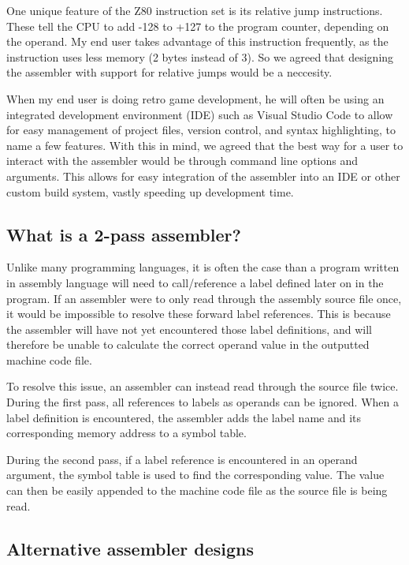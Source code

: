 \documentclass[a4paper]{report}
\begin{document}
One unique feature of the Z80 instruction set is its relative jump instructions.
These tell the CPU to add -128 to +127 to the program counter, depending on the
operand. My end user takes advantage of this instruction frequently, as the
instruction uses less memory (2 bytes instead of 3). So we agreed that designing
the assembler with support for relative jumps would be a neccesity.

When my end user is doing retro game development, he will often be using an
integrated development environment (IDE) such as Visual Studio Code to allow for
easy management of project files, version control, and syntax highlighting, to
name a few features. With this in mind, we agreed that the best way for a user
to interact with the assembler would be through command line options and
arguments. This allows for easy integration of the assembler into an IDE or
other custom build system, vastly speeding up development time.


\subsection{What is a 2-pass assembler?}

Unlike many programming languages, it is often the case than a program written
in assembly language will need to call/reference a label defined later on in the
program. If an assembler were to only read through the assembly source file
once, it would be impossible to resolve these forward label references. This is
because the assembler will have not yet encountered those label definitions, and
will therefore be unable to calculate the correct operand value in the outputted
machine code file.

To resolve this issue, an assembler can instead read through the source file
twice. During the first pass, all references to labels as operands can be
ignored. When a label definition is encountered, the assembler adds the
label name and its corresponding memory address to a symbol table.

During the second pass, if a label reference is encountered in an operand
argument, the symbol table is used to find the corresponding value. The value
can then be easily appended to the machine code file as the source file is being
read.

\subsection{Alternative assembler designs}
\end{document}
